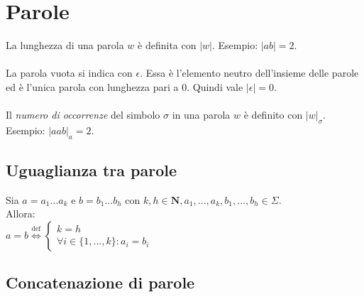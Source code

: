 \documentclass[]{article}
\begin{document}
\section{Parole}

La lunghezza di una parola \mbox{$w$} è definita con \mbox{$|w|$}. Esempio: \mbox{$|ab| = 2$}.
\\
\\
La parola vuota si indica con \mbox{$\epsilon$}. Essa è l'elemento neutro dell'insieme delle parole ed è l'unica
parola con lunghezza pari a \mbox{$0$}. Quindi vale \mbox{$|\epsilon|=0$}.
\\
\\
Il \textit{numero di occorrenze} del simbolo \mbox{$\sigma$} in una parola \mbox{$w$} è definito con \mbox{$|w|_\sigma$}. Esempio: \mbox{$|aab|_a=2$}.


\subsection{Uguaglianza tra parole}

Sia
\begin{math}
a = a_1...a_k
\end{math}
e
\begin{math}
b = b_1...b_h
\end{math}
con
\begin{math}
k, h \in \mathbf{N},
a_1, ..., a_k, b_1, ..., b_h \in \Sigma
\end{math}.
\\
Allora:
\\
\begin{math}
a=b
\overset{\text{def}}{\Leftrightarrow}
\begin{cases}
k = h \\
\forall i \in \{1, ..., k\} : a_i=b_i
\end{cases}
\end{math}

\newpage
\subsection{Concatenazione di parole}
\end{document}
